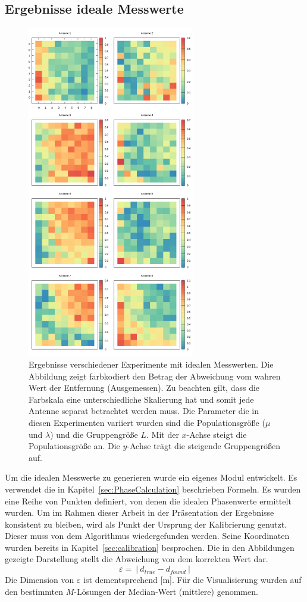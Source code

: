\subsection{Ergebnisse ideale Messwerte}
%
\begin{figure}[h!]
	\centering
	\caption[Ergebnis-Heatmap - Ideale Messwerte]{ Ergebnisse verschiedener Experimente mit idealen Messwerten. Die Abbildung zeigt farbkodiert den Betrag der Abweichung vom wahren Wert der Entfernung (Ausgemessen). Zu beachten gilt, dass die Farbskala eine unterschiedliche Skalierung hat und somit jede Antenne separat betrachtet werden muss. Die Parameter die in diesen Experimenten variiert wurden sind die Populationsgröße ($\mu$ und $\lambda$) und die Gruppengröße $L$. Mit der $x$-Achse steigt die Populationsgröße an. Die $y$-Achse trägt die steigende Gruppengrößen auf.}
	\label{fig:results1}
	\includegraphics[width=0.65\textwidth]{img/result.png}
\end{figure}
% 
Um die idealen Messwerte zu generieren wurde ein eigenes Modul entwickelt. Es verwendet die in Kapitel~\ref{sec:PhaseCalculation} beschrieben Formeln. Es wurden eine Reihe von Punkten definiert, von denen die idealen Phasenwerte ermittelt wurden. Um im Rahmen dieser Arbeit in der Präsentation der Ergebnisse konsistent zu bleiben, wird als Punkt der Ursprung der Kalibrierung genutzt. Dieser muss von dem Algorithmus wiedergefunden werden. Seine Koordinaten wurden bereits in Kapitel~\ref{sec:calibration} besprochen. Die in den Abbildungen gezeigte Darstellung stellt die Abweichung von dem korrekten Wert dar.
%
$$
\varepsilon=~|~d_{true}-d_{found}~|
$$
%
Die Dimension von $\varepsilon$ ist dementsprechend [m]. Für die Visualisierung wurden auf den bestimmten $M$-Lösungen der Median-Wert (mittlere) genommen. 
%

